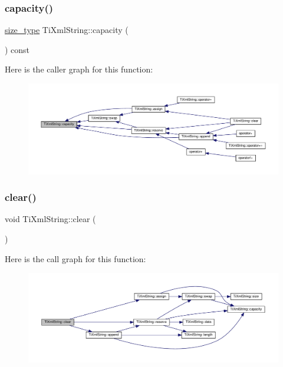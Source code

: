 \subsubsection{\texorpdfstring{capacity()}{capacity()}}
{\footnotesize\ttfamily \hyperlink{class_ti_xml_string_abeb2c1893a04c17904f7c06546d0b971}{size\+\_\+type} Ti\+Xml\+String\+::capacity (\begin{DoxyParamCaption}{ }\end{DoxyParamCaption}) const\hspace{0.3cm}{\ttfamily [inline]}}

Here is the caller graph for this function\+:
\nopagebreak
\begin{figure}[H]
\begin{center}
\leavevmode
\includegraphics[width=350pt]{class_ti_xml_string_a0ca248f026e698f79b8aa4c9ab8e1571_icgraph}
\end{center}
\end{figure}
\mbox{\label{class_ti_xml_string_ab20e06e4c666abf3bdbfb3a1191d4888}} 
\subsubsection{\texorpdfstring{clear()}{clear()}}
{\footnotesize\ttfamily void Ti\+Xml\+String\+::clear (\begin{DoxyParamCaption}{ }\end{DoxyParamCaption})\hspace{0.3cm}{\ttfamily [inline]}}

Here is the call graph for this function\+:
\nopagebreak
\begin{figure}[H]
\begin{center}
\leavevmode
\includegraphics[width=350pt]{class_ti_xml_string_ab20e06e4c666abf3bdbfb3a1191d4888_cgraph}
\end{center}
\end{figure}
\mbox{\label{class_ti_xml_string_a0e010e1737cfc3ee885b42875171b88e}} 
